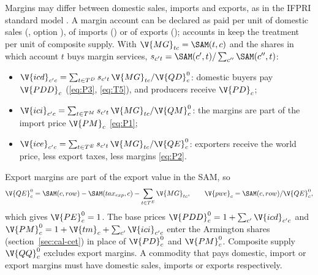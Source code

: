 Margins may differ between domestic sales, imports and exports, as in the
IFPRI standard model \citep{lofgren2002}. A margin account can be declared as
paid per unit of domestic sales (, option
), of imports () or of exports
(); accounts in  keep the
treatment per unit of composite supply. With $\V{MG}_{tc} = \SAM(t, c)$ and
the shares in which account $t$ buys margin services,
$s_{c't} = \SAM(c', t) / \sum_{c''} \SAM(c'', t)$:
\begin{itemize}
\item $\V{icd}_{c'c} = \sum_{t \in T^D} s_{c't}\,\V{MG}_{tc} / \V{QD}^0_c$:
domestic buyers pay $\V{PDD}_c$ (\eqref{eq:P3}, \eqref{eq:T5}), and producers
receive $\V{PD}_c$;
\item $\V{ici}_{c'c} = \sum_{t \in T^M} s_{c't}\,\V{MG}_{tc} / \V{QM}^0_c$:
the margins are part of the import price $\V{PM}_c$ \eqref{eq:P1};
\item $\V{ice}_{c'c} = \sum_{t \in T^E} s_{c't}\,\V{MG}_{tc} / \V{QE}^0_c$:
exporters receive the world price, less export taxes, less margins
\eqref{eq:P2}.
\end{itemize}
Export margins are part of the export value in the SAM, so
\begin{equation*}
\V{QE}^0_c = \SAM(c, row) - \SAM(tax_{exp}, c) - \sum_{t \in T^E} \V{MG}_{tc},
\qquad \V{pwe}_c = \SAM(c, row) / \V{QE}^0_c,
\end{equation*}
which gives $\V{PE}^0_c = 1$. The base prices
$\V{PDD}^0_c = 1 + \sum_{c'} \V{icd}_{c'c}$ and
$\V{PM}^0_c = 1 + \V{tm}_c + \sum_{c'} \V{ici}_{c'c}$ enter the Armington shares
(section~\ref{sec:cal-cet}) in place of $\V{PD}^0_c$ and $\V{PM}^0_c$.
Composite supply $\V{QQ}^0_c$ excludes export margins. A commodity that pays
domestic, import or export margins must have domestic sales, imports or
exports respectively.
